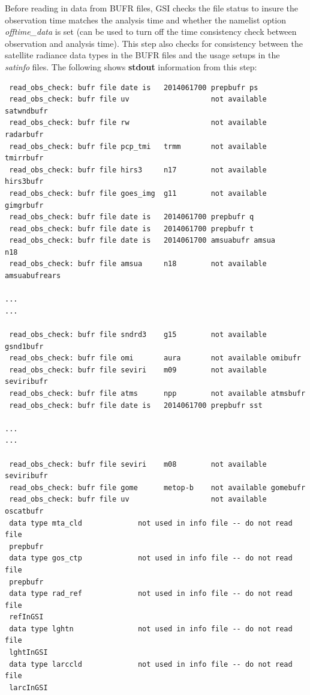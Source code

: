 Before reading in data from BUFR files, GSI checks the file status to insure the observation time matches the analysis time and whether the namelist option \textit{offtime\_data} is set (can be used to turn off the time consistency check between observation and analysis time). This step also checks for consistency between the satellite radiance data types in the BUFR files and the usage setups in the \textit{satinfo} files. The following shows \textbf{stdout} information from this step:

\begin{scriptsize}
\begin{verbatim}
 read_obs_check: bufr file date is   2014061700 prepbufr ps
 read_obs_check: bufr file uv                   not available satwndbufr
 read_obs_check: bufr file rw                   not available radarbufr
 read_obs_check: bufr file pcp_tmi   trmm       not available tmirrbufr
 read_obs_check: bufr file hirs3     n17        not available hirs3bufr
 read_obs_check: bufr file goes_img  g11        not available gimgrbufr
 read_obs_check: bufr file date is   2014061700 prepbufr q
 read_obs_check: bufr file date is   2014061700 prepbufr t
 read_obs_check: bufr file date is   2014061700 amsuabufr amsua     n18
 read_obs_check: bufr file amsua     n18        not available amsuabufrears

...
...
 
 read_obs_check: bufr file sndrd3    g15        not available gsnd1bufr
 read_obs_check: bufr file omi       aura       not available omibufr
 read_obs_check: bufr file seviri    m09        not available seviribufr
 read_obs_check: bufr file atms      npp        not available atmsbufr
 read_obs_check: bufr file date is   2014061700 prepbufr sst

...
...

 read_obs_check: bufr file seviri    m08        not available seviribufr
 read_obs_check: bufr file gome      metop-b    not available gomebufr
 read_obs_check: bufr file uv                   not available oscatbufr
 data type mta_cld             not used in info file -- do not read file
 prepbufr
 data type gos_ctp             not used in info file -- do not read file
 prepbufr
 data type rad_ref             not used in info file -- do not read file
 refInGSI
 data type lghtn               not used in info file -- do not read file
 lghtInGSI
 data type larccld             not used in info file -- do not read file
 larcInGSI
\end{verbatim}
\end{scriptsize}


